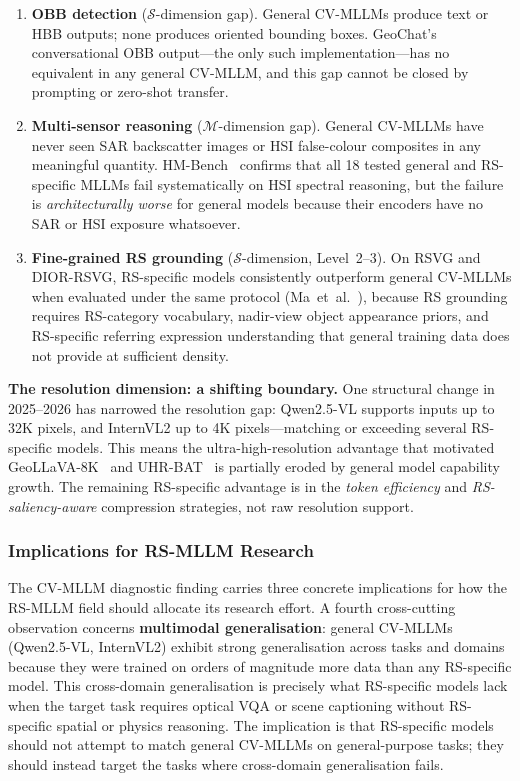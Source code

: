 \begin{enumerate}

\item \textbf{OBB detection} ($\mathcal{S}$-dimension gap). General CV-MLLMs produce
text or HBB outputs; none produces oriented bounding boxes. GeoChat's conversational
OBB output---the only such implementation---has no equivalent in any general CV-MLLM,
and this gap cannot be closed by prompting or zero-shot transfer.

\item \textbf{Multi-sensor reasoning} ($\mathcal{M}$-dimension gap). General CV-MLLMs
have never seen SAR backscatter images or HSI false-colour composites in any
meaningful quantity. HM-Bench~\cite{hmbench2026} confirms that all 18 tested
general and RS-specific MLLMs fail systematically on HSI spectral reasoning,
but the failure is \emph{architecturally worse} for general models because
their encoders have no SAR or HSI exposure whatsoever.

\item \textbf{Fine-grained RS grounding} ($\mathcal{S}$-dimension, Level~2--3).
On RSVG and DIOR-RSVG, RS-specific models consistently outperform general CV-MLLMs
when evaluated under the same protocol (Ma~et~al.~\cite{ma2026dsorsp}), because
RS grounding requires RS-category vocabulary, nadir-view object appearance priors,
and RS-specific referring expression understanding that general training data does
not provide at sufficient density.

\end{enumerate}

\textbf{The resolution dimension: a shifting boundary.}
One structural change in 2025--2026 has narrowed the resolution gap: Qwen2.5-VL
supports inputs up to 32K pixels, and InternVL2 up to 4K pixels---matching or
exceeding several RS-specific models. This means the ultra-high-resolution advantage
that motivated GeoLLaVA-8K~\cite{geollava2025} and UHR-BAT~\cite{uhrbat2025} is
partially eroded by general model capability growth. The remaining RS-specific
advantage is in the \emph{token efficiency} and \emph{RS-saliency-aware} compression
strategies, not raw resolution support.

\subsubsection{Implications for RS-MLLM Research}\label{sec6:cvmllm_impl}

The CV-MLLM diagnostic finding carries three concrete implications for how the
RS-MLLM field should allocate its research effort. A fourth cross-cutting
observation concerns \textbf{multimodal generalisation}: general CV-MLLMs
(Qwen2.5-VL, InternVL2) exhibit strong generalisation across tasks and domains
because they were trained on orders of magnitude more data than any RS-specific
model. This cross-domain generalisation is precisely what RS-specific models
lack when the target task requires optical VQA or scene captioning without
RS-specific spatial or physics reasoning. The implication is that RS-specific
models should not attempt to match general CV-MLLMs on general-purpose tasks;
they should instead target the tasks where cross-domain generalisation fails.

